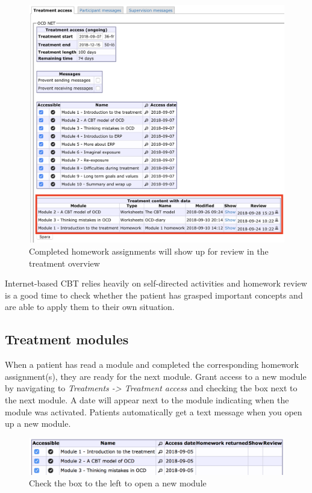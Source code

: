 \documentclass[]{book}
\theoremstyle{definition}
\theoremstyle{definition}
\theoremstyle{definition}
\theoremstyle{remark}
\begin{document}
\begin{figure}
\centering
\includegraphics{images/homework-complete.png}
\caption{Completed homework assignments will show up for review in the
treatment overview}
\end{figure}

Internet-based CBT relies heavily on self-directed activities and
homework review is a good time to check whether the patient has grasped
important concepts and are able to apply them to their own situation.

\hypertarget{treatment-modules}{%
\subsection{Treatment modules}\label{treatment-modules}}

When a patient has read a module and completed the corresponding
homework assignment(s), they are ready for the next module. Grant access
to a new module by navigating to \emph{Treatments -\textgreater{}
Treatment access} and checking the box next to the next module. A date
will appear next to the module indicating when the module was activated.
Patients automatically get a text message when you open up a new module.

\begin{figure}
\centering
\includegraphics{images/module-access.png}
\caption{Check the box to the left to open a new module}
\end{figure}
\end{document}
